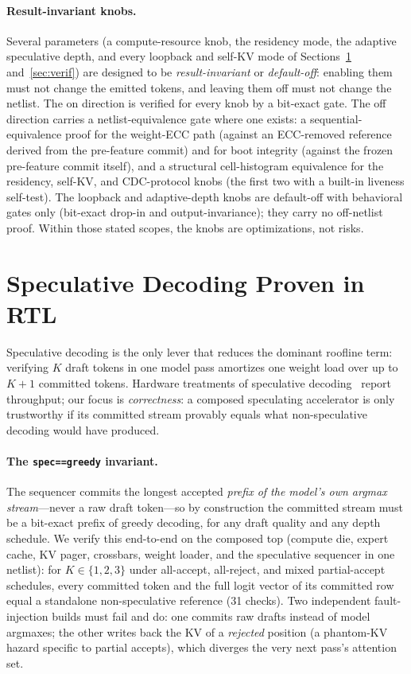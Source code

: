 \documentclass[11pt]{article}
\newcommand{\code}[1]{\texttt{#1}}
\begin{document}
\paragraph{Result-invariant knobs.} Several parameters (a compute-resource
knob, the residency mode, the adaptive speculative depth, and every loopback
and self-KV mode of Sections~\ref{sec:spec} and~\ref{sec:verif}) are designed
to be \emph{result-invariant} or \emph{default-off}: enabling them must not
change the emitted tokens, and leaving them off must not change the netlist.
The on direction is verified for every knob by a bit-exact gate. The off
direction carries a netlist-equivalence gate where one exists: a
sequential-equivalence proof for the weight-ECC path (against an ECC-removed
reference derived from the pre-feature commit) and for boot integrity (against
the frozen pre-feature commit itself), and a structural cell-histogram
equivalence for the residency, self-KV, and CDC-protocol knobs (the first two
with a built-in liveness self-test). The loopback and adaptive-depth knobs are
default-off with behavioral gates only (bit-exact drop-in and
output-invariance); they carry no off-netlist proof. Within those stated
scopes, the knobs are optimizations, not risks.

\section{Speculative Decoding Proven in RTL}
\label{sec:spec}

Speculative decoding is the only lever that reduces the dominant roofline term:
verifying $K$ draft tokens in one model pass amortizes one weight load over up
to $K{+}1$ committed tokens. Hardware treatments of speculative
decoding~\cite{hades,specpim,specmamba} report throughput; our focus is
\emph{correctness}: a composed speculating accelerator is only trustworthy if
its committed stream provably equals what non-speculative decoding would have
produced.

\paragraph{The \code{spec==greedy} invariant.} The sequencer commits the
longest accepted \emph{prefix of the model's own argmax stream}---never a raw draft
token---so by construction the committed stream must be a bit-exact prefix of
greedy decoding, for any draft quality and any depth schedule. We verify this
end-to-end on the composed top (compute die, expert cache, KV pager, crossbars,
weight loader, and the speculative sequencer in one netlist): for
$K\in\{1,2,3\}$ under all-accept, all-reject, and mixed partial-accept
schedules, every committed token and the full logit vector of its committed row
equal a standalone non-speculative reference (31 checks).
Two independent fault-injection builds must fail and do: one commits raw
drafts instead of model argmaxes; the other writes back the KV of a
\emph{rejected} position (a phantom-KV hazard specific to partial accepts),
which diverges the very next pass's attention set.
\end{document}
